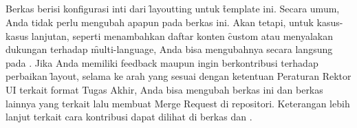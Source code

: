 \subsection{}
\label{sec:uithesis.sty}
Berkas  berisi konfigurasi inti dari \f{layoutting} untuk \f{template} ini.
Secara umum, Anda tidak perlu mengubah apapun pada berkas ini.
Akan tetapi, untuk kasus-kasus lanjutan, seperti menambahkan daftar konten \f{custom} atau menyalakan dukungan terhadap \f{multi-language}, Anda bisa mengubahnya secara langsung pada .
Jika Anda memiliki feedback maupun ingin berkontribusi terhadap perbaikan \f{layout}, selama ke arah yang sesuai dengan ketentuan Peraturan Rektor UI terkait format Tugas Akhir, Anda bisa mengubah berkas ini dan berkas lainnya yang terkait lalu membuat Merge Request di repositori.
Keterangan lebih lanjut terkait cara kontribusi dapat dilihat di berkas  dan .


